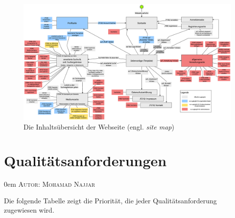 \documentclass{article}
\makeatletter
\newcommand{\sectionauthor}[1]{
	{\parindent 0em \large \scshape Autor: #1 \par \nobreak \vspace*{2em}}
	\@afterheading
}
\makeatother
\begin{document}
\newpage
{}

\begin{figure}[h]
    \centering
    \includegraphics[angle = 270, width = 40em]{site_map}
    \caption{Die Inhaltsübersicht der Webseite (engl. \textit{site map})}
    \label{site_map}
\end{figure}

\restoregeometry
\newpage

\section{Qualitätsanforderungen} %
\sectionauthor{Mohamad Najjar}

Die folgende Tabelle zeigt die Priorität, die jeder Qualitätsanforderung zugewiesen wird.
	
\end{document}
